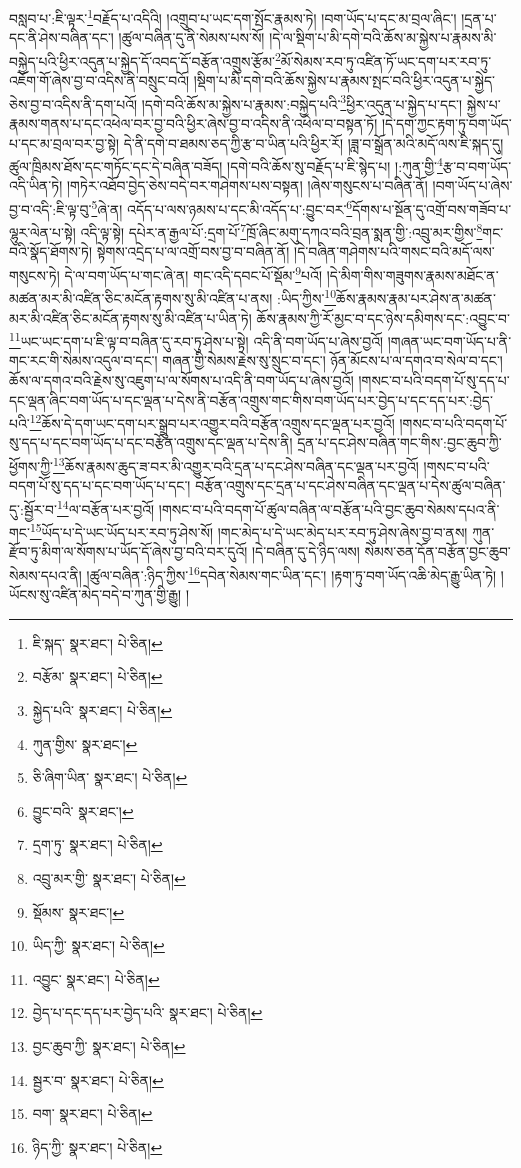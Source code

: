 བསླབ་པ་:ཇི་ལྟར་\footnote{ཇི་སྐད་  སྣར་ཐང་།  པེ་ཅིན། }བརྗོད་པ་འདིའི། །འགྲུབ་པ་ཡང་དག་སྤོང་རྣམས་ཏེ། །བག་ཡོད་པ་དང་མ་བྲལ་ཞིང་། །དྲན་པ་དང་ནི་ཤེས་བཞིན་དང་། །ཚུལ་བཞིན་དུ་ནི་སེམས་པས་སོ། །དེ་ལ་སྡིག་པ་མི་དགེ་བའི་ཆོས་མ་སྐྱེས་པ་རྣམས་མི་བསྐྱེད་པའི་ཕྱིར་འདུན་པ་སྐྱེད་དོ་འབད་དོ་བརྩོན་འགྲུས་རྩོམ་\footnote{བརྩོམ་  སྣར་ཐང་།  པེ་ཅིན། }མོ་སེམས་རབ་ཏུ་འཛིན་ཏོ་ཡང་དག་པར་རབ་ཏུ་འཇོག་གོ་ཞེས་བྱ་བ་འདིས་ནི་བསྲུང་བའོ། །སྡིག་པ་མི་དགེ་བའི་ཆོས་སྐྱེས་པ་རྣམས་སྤང་བའི་ཕྱིར་འདུན་པ་སྐྱེད་ཅེས་བྱ་བ་འདིས་ནི་དག་པའོ། །དགེ་བའི་ཆོས་མ་སྐྱེས་པ་རྣམས་:བསྐྱེད་པའི་\footnote{སྐྱེད་པའི་  སྣར་ཐང་།  པེ་ཅིན། }ཕྱིར་འདུན་པ་སྐྱེད་པ་དང་། སྐྱེས་པ་རྣམས་གནས་པ་དང་འཕེལ་བར་བྱ་བའི་ཕྱིར་ཞེས་བྱ་བ་འདིས་ནི་འཕེལ་བ་བསྟན་ཏོ། །དེ་དག་ཀྱང་རྟག་ཏུ་བག་ཡོད་པ་དང་མ་བྲལ་བར་བྱ་སྟེ། དེ་ནི་དགེ་བ་ཐམས་ཅད་ཀྱི་རྩ་བ་ཡིན་པའི་ཕྱིར་རོ། །ཟླ་བ་སྒྲོན་མའི་མདོ་ལས་ཇི་སྐད་དུ། ཚུལ་ཁྲིམས་ཐོས་དང་གཏོང་དང་དེ་བཞིན་བཟོད། །དགེ་བའི་ཆོས་སུ་བརྗོད་པ་ཇི་སྙེད་པ། །:ཀུན་གྱི་\footnote{ཀུན་གྱིས་  སྣར་ཐང་། }རྩ་བ་བག་ཡོད་འདི་ཡིན་ཏེ། །གཏེར་འཐོབ་བྱེད་ཅེས་བདེ་བར་གཤེགས་པས་བསྟན། །ཞེས་གསུངས་པ་བཞིན་ནོ། །བག་ཡོད་པ་ཞེས་བྱ་བ་འདི་:ཇི་ལྟ་བུ་\footnote{ཅི་ཞིག་ཡིན་  སྣར་ཐང་།  པེ་ཅིན། }ཞེ་ན། འདོད་པ་ལས་ཉམས་པ་དང་མི་འདོད་པ་:བྱུང་བར་\footnote{བྱུང་བའི་  སྣར་ཐང་། }དོགས་པ་སྔོན་དུ་འགྲོ་བས་གཟོབ་པ་ལྷུར་ལེན་པ་སྟེ། འདི་ལྟ་སྟེ། དཔེར་ན་རྒྱལ་པོ་:དྲག་པོ་\footnote{དྲག་ཏུ་  སྣར་ཐང་།  པེ་ཅིན། }ཁྲོ་ཞིང་མགུ་དཀའ་བའི་བྲན་སྨན་གྱི་:འབྲུ་མར་གྱིས་\footnote{འབྲུ་མར་གྱི་  སྣར་ཐང་།  པེ་ཅིན། }གང་བའི་སྣོད་ཐོགས་ཏེ། སྟེགས་འདྲེད་པ་ལ་འགྲོ་བས་བྱ་བ་བཞིན་ནོ། །དེ་བཞིན་གཤེགས་པའི་གསང་བའི་མདོ་ལས་གསུངས་ཏེ། དེ་ལ་བག་ཡོད་པ་གང་ཞེ་ན། གང་འདི་དབང་པོ་སྡོམ་\footnote{སྡོམས་  སྣར་ཐང་། }པའོ། །དེ་མིག་གིས་གཟུགས་རྣམས་མཐོང་ན་མཚན་མར་མི་འཛིན་ཅིང་མངོན་རྟགས་སུ་མི་འཛིན་པ་ནས། :ཡིད་ཀྱིས་\footnote{ཡིད་ཀྱི་  སྣར་ཐང་།  པེ་ཅིན། }ཆོས་རྣམས་རྣམ་པར་ཤེས་ན་མཚན་མར་མི་འཛིན་ཅིང་མངོན་རྟགས་སུ་མི་འཛིན་པ་ཡིན་ཏེ། ཆོས་རྣམས་ཀྱི་རོ་མྱང་བ་དང་ཉེས་དམིགས་དང་:འབྱུང་བ་\footnote{འབྱུང་  སྣར་ཐང་།  པེ་ཅིན། }ཡང་ཡང་དག་པ་ཇི་ལྟ་བ་བཞིན་དུ་རབ་ཏུ་ཤེས་པ་སྟེ། འདི་ནི་བག་ཡོད་པ་ཞེས་བྱའོ། །གཞན་ཡང་བག་ཡོད་པ་ནི་གང་རང་གི་སེམས་འདུལ་བ་དང་། གཞན་གྱི་སེམས་རྗེས་སུ་སྲུང་བ་དང་། ཉོན་མོངས་པ་ལ་དགའ་བ་སེལ་བ་དང་། ཆོས་ལ་དགའ་བའི་རྗེས་སུ་འཇུག་པ་ལ་སོགས་པ་འདི་ནི་བག་ཡོད་པ་ཞེས་བྱའོ། །གསང་བ་པའི་བདག་པོ་སུ་དད་པ་དང་ལྡན་ཞིང་བག་ཡོད་པ་དང་ལྡན་པ་དེས་ནི་བརྩོན་འགྲུས་གང་གིས་བག་ཡོད་པར་བྱེད་པ་དང་དད་པར་:བྱེད་པའི་\footnote{བྱེད་པ་དང་དད་པར་བྱེད་པའི་  སྣར་ཐང་།  པེ་ཅིན། }ཆོས་དེ་དག་ཡང་དག་པར་སྒྲུབ་པར་འགྱུར་བའི་བརྩོན་འགྲུས་དང་ལྡན་པར་བྱའོ། །གསང་བ་པའི་བདག་པོ་སུ་དད་པ་དང་བག་ཡོད་པ་དང་བརྩོན་འགྲུས་དང་ལྡན་པ་དེས་ནི། དྲན་པ་དང་ཤེས་བཞིན་གང་གིས་:བྱང་ཆུབ་ཀྱི་ཕྱོགས་ཀྱི་\footnote{བྱང་ཆུབ་ཀྱི་  སྣར་ཐང་།  པེ་ཅིན། }ཆོས་རྣམས་ཆུད་ཟ་བར་མི་འགྱུར་བའི་དྲན་པ་དང་ཤེས་བཞིན་དང་ལྡན་པར་བྱའོ། །གསང་བ་པའི་བདག་པོ་སུ་དད་པ་དང་བག་ཡོད་པ་དང་། བརྩོན་འགྲུས་དང་དྲན་པ་དང་ཤེས་བཞིན་དང་ལྡན་པ་དེས་ཚུལ་བཞིན་དུ་:སྦྱོར་བ་\footnote{སྦྱར་བ་  སྣར་ཐང་།  པེ་ཅིན། }ལ་བརྩོན་པར་བྱའོ། །གསང་བ་པའི་བདག་པོ་ཚུལ་བཞིན་ལ་བརྩོན་པའི་བྱང་ཆུབ་སེམས་དཔའ་ནི་གང་\footnote{བག་  སྣར་ཐང་།  པེ་ཅིན། }ཡོད་པ་དེ་ཡང་ཡོད་པར་རབ་ཏུ་ཤེས་སོ། །གང་མེད་པ་དེ་ཡང་མེད་པར་རབ་ཏུ་ཤེས་ཞེས་བྱ་བ་ནས། ཀུན་རྫོབ་ཏུ་མིག་ལ་སོགས་པ་ཡོད་དོ་ཞེས་བྱ་བའི་བར་དུའོ། །དེ་བཞིན་དུ་དེ་ཉིད་ལས། སེམས་ཅན་དོན་བརྩོན་བྱང་ཆུབ་སེམས་དཔའ་ནི། །ཚུལ་བཞིན་:ཉིད་ཀྱིས་\footnote{ཉིད་ཀྱི་  སྣར་ཐང་།  པེ་ཅིན། }དབེན་སེམས་གང་ཡིན་དང་། །རྟག་ཏུ་བག་ཡོད་འཆི་མེད་རྒྱུ་ཡིན་ཏེ། །ཡོངས་སུ་འཛིན་མེད་བདེ་བ་ཀུན་གྱི་རྒྱུ། །
